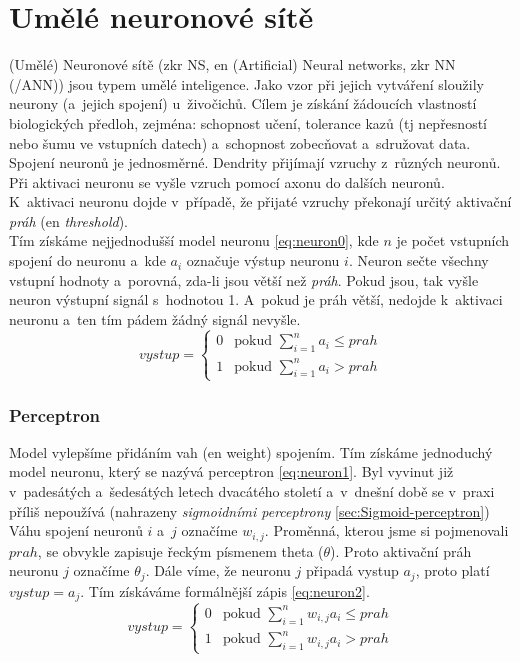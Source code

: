 \documentclass[12pt,oneside]{report}			%
\begin{document}
	\section{Umělé neuronové sítě}
	\label{sec:NN-uvod}
	(Umělé) Neuronové sítě (\gls{zkr} \gls{NS}, \gls{en} (Artificial) Neural networks, \gls{zkr} \gls{NN} (/\gls{ANN})) jsou typem umělé inteligence. Jako vzor při jejich vytváření sloužily neurony (a~jejich spojení) u~živočichů. Cílem je získání žádoucích vlastností biologických předloh, zejména: schopnost učení, tolerance kazů (\gls{tj} nepřesností nebo šumu ve vstupních datech) a~schopnost zobecňovat a~sdružovat data. \parencite[\gls{s} 3-5]{NN_introduction-Kriessel}\\
	Spojení neuronů je jednosměrné. Dendrity přijímají vzruchy z~různých neuronů. Při aktivaci neuronu se vyšle vzruch pomocí axonu do dalších neuronů. K~aktivaci neuronu dojde v~případě, že přijaté vzruchy překonají určitý aktivační \emph{práh} (\gls{en} \emph{threshold}).\parencite[\gls{str} 21]{NN_introduction-Kriessel}\\
	Tím získáme nejjednodušší model neuronu \eqref{eq:neuron0}, kde $n$ je počet vstupních spojení do neuronu a~kde $a_i$ označuje výstup neuronu $i$. Neuron sečte všechny vstupní hodnoty a~porovná, zda-li jsou větší než \emph{práh}. Pokud jsou, tak vyšle neuron výstupní signál s~hodnotou 1. A~pokud je práh větší, nedojde k~aktivaci neuronu a~ten tím pádem žádný signál nevyšle.
	\begin{equation}
	\label{eq:neuron0}
	vystup = 
		\begin{cases}
		0 & \text{pokud $\sum_{i=1}^{n} a_i \leq prah$}\\
		1 & \text{pokud $\sum_{i=1}^{n} a_i > prah$}
		\end{cases}
	\end{equation}
	
	\subsubsection{Perceptron}
	Model vylepšíme přidáním vah (\gls{en} weight) spojením. Tím získáme jednoduchý model neuronu, který se nazývá perceptron \eqref{eq:neuron1}. Byl vyvinut již v~padesátých a~šedesátých letech dvacátého století a~v~dnešní době se v~praxi příliš nepoužívá (nahrazeny \emph{sigmoidními perceptrony} \ref{sec:Sigmoid-perceptron})\parencite[\gls{k} 1.1]{NN-Nielsen-web}\\
	Váhu spojení neuronů $i$ a~$j$ označíme $w_{i,j}$. Proměnná, kterou jsme si pojmenovali $prah$, se obvykle zapisuje řeckým písmenem theta ($\theta$). Proto aktivační práh neuronu  $j$ označíme $\theta_{j}$. Dále víme, že neuronu $j$ připadá vystup $a_j$, proto platí $vystup=a_j$. Tím získáváme formálnější zápis \eqref{eq:neuron2}.
	\begin{equation}
	\label{eq:neuron1}
	vystup = 
		\begin{cases}
		0 & \text{pokud $\sum_{i=1}^{n} w_{i,j} a_i \leq prah$}\\
		1 & \text{pokud $\sum_{i=1}^{n} w_{i,j} a_i > prah$}
		\end{cases}
	\end{equation}
	
\end{document}

